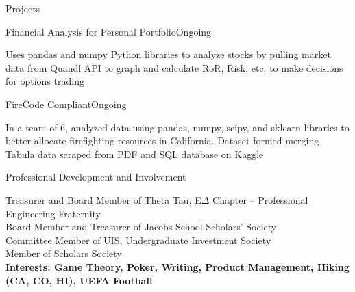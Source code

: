 \documentclass{resume} %
\newcommand{\tab}[1]{\hspace{.2667\textwidth}\rlap{#1}}
\newcommand{\itab}[1]{\hspace{0em}\rlap{#1}}
\begin{document}
\iffalse
\begin{rSection}{}{Relevant Coursework}
\itab{Algorithm \& Systems Analysis} \tab{}  \tab{Computer Organization \& Systems Programs} 
\\ \itab{Data Structures \& OO Design} \tab{}  \tab{Financial \& Managerial Accounting} 
\\ \itab{Udemy coursework in HTML/CSS for Web Design} \tab{} \tab{Udemy coursework in Python for Financial Analysis}

\end{rSection}
\fi


\begin{rSection}{\color{NavyBlue}\faDatabase{ }}{Projects} 

\begin{rSubsection}{}{Financial Analysis for Personal Portfolio}{Ongoing}{}{}
\item Uses pandas and numpy Python libraries to analyze stocks by pulling market data from Quandl API to graph and calculate RoR, Risk, etc. to make decisions for options trading
\end{rSubsection}
\begin{rSubsection}{}{FireCode Compliant}{Ongoing}{}{}
\item In a team of 6, analyzed data using pandas, numpy, scipy, and sklearn libraries to better allocate firefighting resources in California. Dataset formed merging Tabula data scraped from PDF and SQL database on Kaggle

\end{rSubsection}
\end{rSection}


\begin{rSection}{\color{NavyBlue}\faUsers{ }}{Professional Development and Involvement} 

Treasurer and Board Member of Theta Tau, E$\Delta$ Chapter -- Professional Engineering Fraternity
\\Board Member and Treasurer of Jacobs School Scholars' Society 
\\Committee Member of UIS, Undergraduate Investment Society
\\Member of Scholars Society
\\ \bf{Interests: }Game Theory, Poker, Writing, Product Management, Hiking (CA, CO, HI), UEFA Football
\end{rSection}


\end{document}

